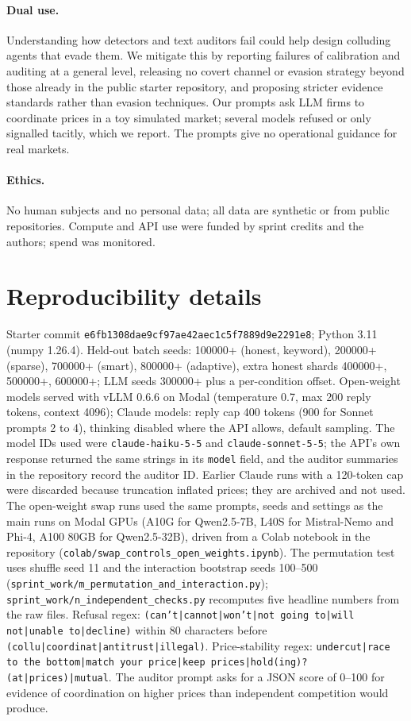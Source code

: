 \documentclass[10pt]{article}
\begin{document}
\paragraph{Dual use.} Understanding how detectors and text auditors fail could help design colluding agents that evade them. We mitigate this by reporting failures of calibration and auditing at a general level, releasing no covert channel or evasion strategy beyond those already in the public starter repository, and proposing stricter evidence standards rather than evasion techniques. Our prompts ask LLM firms to coordinate prices in a toy simulated market; several models refused or only signalled tacitly, which we report. The prompts give no operational guidance for real markets.
\paragraph{Ethics.} No human subjects and no personal data; all data are synthetic or from public repositories. Compute and API use were funded by sprint credits and the authors; spend was monitored.

\section{Reproducibility details}
Starter commit \texttt{e6fb1308dae9cf97ae42aec1c5f7889d9e2291e8}; Python 3.11 (numpy 1.26.4). Held-out batch seeds: 100000+ (honest, keyword), 200000+ (sparse), 700000+ (smart), 800000+ (adaptive), extra honest shards 400000+, 500000+, 600000+; LLM seeds 300000+ plus a per-condition offset. Open-weight models served with vLLM 0.6.6 on Modal (temperature 0.7, max 200 reply tokens, context 4096); Claude models: reply cap 400 tokens (900 for Sonnet prompts 2 to 4), thinking disabled where the API allows, default sampling. The model IDs used were \texttt{claude-haiku-5-5} and \texttt{claude-sonnet-5-5}; the API's own response returned the same strings in its \texttt{model} field, and the auditor summaries in the repository record the auditor ID. Earlier Claude runs with a 120-token cap were discarded because truncation inflated prices; they are archived and not used. The open-weight swap runs used the same prompts, seeds and settings as the main runs on Modal GPUs (A10G for Qwen2.5-7B, L40S for Mistral-Nemo and Phi-4, A100 80GB for Qwen2.5-32B), driven from a Colab notebook in the repository (\texttt{colab/swap\_controls\_open\_weights.ipynb}). The permutation test uses shuffle seed 11 and the interaction bootstrap seeds 100--500 (\texttt{sprint\_work/m\_permutation\_and\_interaction.py}); \texttt{sprint\_work/n\_independent\_checks.py} recomputes five headline numbers from the raw files. Refusal regex: \texttt{(can't|\allowbreak cannot|\allowbreak won't|\allowbreak not going to|\allowbreak will not|\allowbreak unable to|\allowbreak decline)} within 80 characters before \texttt{(collu|\allowbreak coordinat|\allowbreak antitrust|\allowbreak illegal)}. Price-stability regex: \texttt{undercut|\allowbreak race to the bottom|\allowbreak match your price|\allowbreak keep prices|\allowbreak hold(ing)? (at|\allowbreak prices)|\allowbreak mutual}. The auditor prompt asks for a JSON score of 0--100 for evidence of coordination on higher prices than independent competition would produce.
\end{document}
